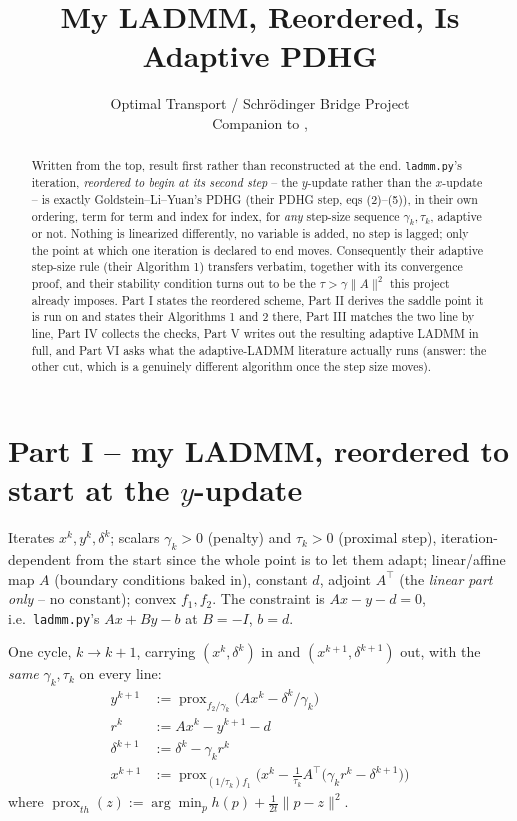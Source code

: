 \documentclass[11pt]{article}
\title{My LADMM, Reordered, Is Adaptive PDHG}
\author{Optimal Transport / Schr\"odinger Bridge Project\\
Companion to \code{nonuniform\_grid\_xy\_variables.tex}, \code{nonuniform\_grid\_norms.tex}}
\date{}
\newcommand{\code}[1]{\texttt{#1}}
\newcommand{\prox}{\operatorname{prox}}
\begin{document}
\maketitle

\begin{abstract}
Written from the top, result first rather than reconstructed at the end.
\code{ladmm.py}'s iteration, \emph{reordered to begin at its second step} -- the
$y$-update rather than the $x$-update -- is exactly Goldstein--Li--Yuan's PDHG
(their PDHG step, eqs (2)--(5)), in their own ordering, term for term and index for index, for
\emph{any} step-size sequence $\gamma_k,\tau_k$, adaptive or not. Nothing is
linearized differently, no variable is added, no step is lagged; only the point
at which one iteration is declared to end moves. Consequently their adaptive
step-size rule (their Algorithm 1) transfers verbatim, together with its convergence
proof, and their stability condition turns out to be the $\tau>\gamma\|A\|^2$
this project already imposes. Part I states the reordered scheme, Part II derives the
saddle point it is run on and states their Algorithms 1 and 2 there, Part III
matches the two line by line, Part IV collects the checks, Part V writes out the
resulting adaptive LADMM in full, and Part VI asks what the adaptive-LADMM
literature actually runs (answer: the other cut, which is a genuinely different
algorithm once the step size moves).
\end{abstract}

\section*{Part I -- my LADMM, reordered to start at the $y$-update}
Iterates $x^k,y^k,\delta^k$; scalars $\gamma_k>0$ (penalty) and $\tau_k>0$
(proximal step), iteration-dependent from the start since the whole point is to
let them adapt; linear/affine map $A$ (boundary conditions baked in), constant
$d$, adjoint $A^\top$ (the \emph{linear part only} -- no constant); convex
$f_1,f_2$. The constraint is $Ax-y-d=0$, i.e.\ \code{ladmm.py}'s
$Ax+By-b$ at $B=-I$, $b=d$.

One cycle, $k\to k+1$, carrying $(x^k,\delta^k)$ in and $(x^{k+1},\delta^{k+1})$
out, with the \emph{same} $\gamma_k,\tau_k$ on every line:
\begin{align}
y^{k+1} &:= \prox_{f_2/\gamma_k}\big(Ax^{k}-\delta^{k}/\gamma_k\big) \label{eq:y}\\
r^{k} &:= Ax^{k}-y^{k+1}-d \label{eq:r}\\
\delta^{k+1} &:= \delta^{k}-\gamma_k r^{k} \label{eq:delta}\\
x^{k+1} &:= \prox_{(1/\tau_k)f_1}\Big(x^{k}-\tfrac1{\tau_k}A^\top\big(\gamma_k r^{k}-\delta^{k+1}\big)\Big) \label{eq:x}
\end{align}
where $\prox_{th}(z):=\arg\min_p h(p)+\tfrac1{2t}\|p-z\|^2$.
\end{document}
